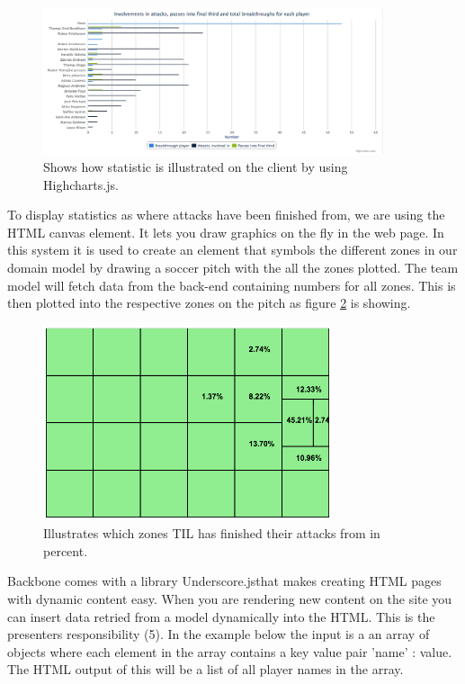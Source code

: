 
\begin{figure}[ht!]
\centering
\includegraphics[width=100mm]{images/general/chart_passes.png}
\caption{Shows how statistic is illustrated on the client by using Highcharts.js.}
\label{fig:chart}
\end{figure}

To display statistics as where attacks have been finished from, we are using the \ac{HTML} canvas element. It lets you draw graphics on the fly in the web page. In this system it is used to create an element that symbols the different zones in our domain model by drawing a soccer pitch with the all the zones plotted. The team model will fetch data from the back-end containing numbers for all zones. This is then plotted into the respective zones on the pitch as figure \ref{fig:attacking_zones} is showing.

\begin{figure}[ht!]
\centering
\includegraphics[width=85mm]{images/general/finishing_zones.png}
\caption{ Illustrates which zones \ac{TIL} has finished their attacks from in percent. }
\label{fig:attacking_zones}
\end{figure}

Backbone comes with a library Underscore.js\footnotemark that makes creating HTML pages with dynamic content easy. When you are rendering new content on the site you can insert data retried from a model dynamically into the HTML. This is the presenters responsibility (5). In the example below the input is a an array of objects where each element in the array contains a key value pair 'name' : value. The HTML output of this will be a list of all player names in the array. 

